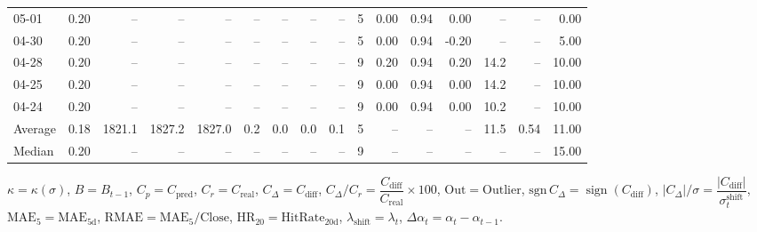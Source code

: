 \begin{threeparttable}
{\begin{tabular}{lrrrrrrrrrrrrrrr}
  05-01 &     0.20 &     -- &     -- &     -- &         -- &             -- &                       -- &                  -- &              5 &       0.00 &      0.94 &           0.00 &               -- &              -- &                   0.00 \\
  04-30 &     0.20 &     -- &     -- &     -- &         -- &             -- &                       -- &                  -- &              5 &       0.00 &      0.94 &          -0.20 &               -- &              -- &                   5.00 \\
  04-28 &     0.20 &     -- &     -- &     -- &         -- &             -- &                       -- &                  -- &              9 &       0.20 &      0.94 &           0.20 &             14.2 &              -- &                  10.00 \\
  04-25 &     0.20 &     -- &     -- &     -- &         -- &             -- &                       -- &                  -- &              9 &       0.00 &      0.94 &           0.00 &             14.2 &              -- &                  10.00 \\
  04-24 &     0.20 &     -- &     -- &     -- &         -- &             -- &                       -- &                  -- &              9 &       0.00 &      0.94 &           0.00 &             10.2 &              -- &                  10.00 \\
Average &     0.18 & 1821.1 & 1827.2 & 1827.0 &        0.2 &            0.0 &                      0.0 &                 0.1 &              5 &         -- &        -- &             -- &             11.5 &            0.54 &                  11.00 \\
 Median &     0.20 &     -- &     -- &     -- &         -- &             -- &                       -- &                  -- &              9 &         -- &        -- &             -- &               -- &              -- &                  15.00 \\
\bottomrule
\end{tabular}
}
\begin{tablenotes}\footnotesize
\item $\kappa=\kappa(\sigma)$, $B=B_{t-1}$, $C_p=C_{\text{pred}}$, $C_r=C_{\text{real}}$, $C_\Delta=C_{\text{diff}}$, $C_\Delta/C_r=\dfrac{C_{\text{diff}}}{C_{\text{real}}}\times100$, $\mathrm{Out}=\text{Outlier}$, $\mathrm{sgn}\,C_\Delta=\operatorname{sign}(C_{\text{diff}})$, $|C_\Delta|/\sigma=\dfrac{|C_{\text{diff}}|}{\sigma_t^{\text{shift}}}$, $\mathrm{MAE}_5=\mathrm{MAE}_{5\text{d}}$, $\mathrm{RMAE}= \mathrm{MAE}_5 / \text{Close}$, $\mathrm{HR}_{20}=\mathrm{HitRate}_{20\text{d}}$, 
$\lambda_{\text{shift}}=\lambda_t$, 
$\Delta\alpha_t=\alpha_t-\alpha_{t-1}$.
\end{tablenotes}
\end{threeparttable}
\endgroup

